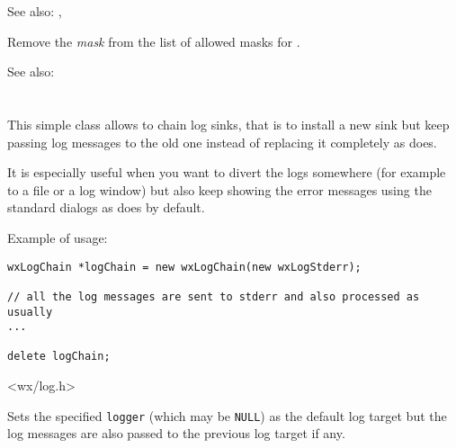 See also: , 

\label{wxlogremovetracemask}


Remove the {\it mask} from the list of allowed masks for 
.

See also: 


\section{}\label{wxlogchain}

This simple class allows to chain log sinks, that is to install a new sink but
keep passing log messages to the old one instead of replacing it completely as 
 does.

It is especially useful when you want to divert the logs somewhere (for
example to a file or a log window) but also keep showing the error messages
using the standard dialogs as  does by default.

Example of usage:

\begin{verbatim}
wxLogChain *logChain = new wxLogChain(new wxLogStderr);

// all the log messages are sent to stderr and also processed as usually
...

delete logChain;

\end{verbatim}




<wx/log.h>


\label{wxlogchainwxlogchain}


Sets the specified {\tt logger} (which may be {\tt NULL}) as the default log
target but the log messages are also passed to the previous log target if any.

